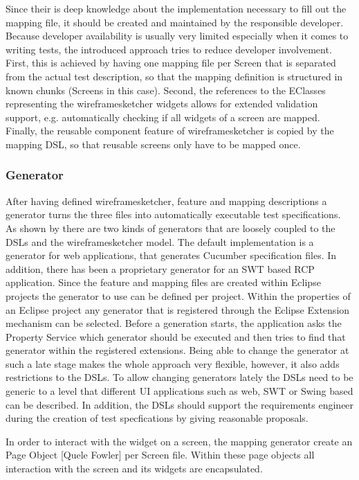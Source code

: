 \documentclass{sig-alternate-05-2015}
\begin{document}
Since their is deep knowledge about the implementation necessary to fill out the mapping file, it should be created and maintained by the responsible developer. 
Because developer availability is usually very limited especially when it comes to writing tests, the introduced approach tries to reduce developer involvement.
First, this is achieved by having one mapping file per Screen that is separated from the actual test description, so that the mapping definition is structured in known chunks (Screens in this case). 
Second, the references to the EClasses representing the wireframesketcher widgets allows for extended validation support, e.g. automatically checking if all widgets of a screen are mapped.
Finally, the reusable component feature of wireframesketcher is copied by the mapping DSL, so that reusable screens only have to be mapped once.

\subsubsection{Generator}
After having defined wireframesketcher, feature and mapping descriptions a generator turns the three files into automatically executable test specifications.
As shown by  there are two kinds of generators that are loosely coupled to the DSLs and the wireframesketcher model.
The default implementation is a generator for web applications, that generates Cucumber specification files.
In addition, there has been a proprietary generator for an SWT based RCP application.
Since the feature and mapping files are created within Eclipse projects the generator to use can be defined per project.
Within the properties of an Eclipse project any generator that is registered through the Eclipse Extension mechanism can be selected.
Before a generation starts, the application asks the Property Service which generator should be executed and then tries to find that generator within the registered extensions.
Being able to change the generator at such a late stage makes the whole approach very flexible, however, it also adds restrictions to the DSLs.
To allow changing generators lately the DSLs need to be generic to a level that different UI applications such as web, SWT or Swing based can be described.
In addition, the DSLs should support the requirements engineer during the creation of test specfications by giving reasonable proposals.

In order to interact with the widget on a screen, the mapping generator create an Page Object [Quele Fowler] per Screen file.
Within these page objects all interaction with the screen and its widgets are encapsulated.
\end{document}
